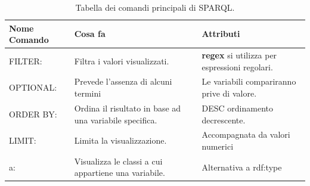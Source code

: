 \documentclass[a4paper,11pt]{article}
\begin{document}
\begin{table}[htb]
\begin{center}				
\begin{tabular}{|>{\small}l|>{\small}l|>{\small}l|}
	\hline \textbf{Nome Comando} & \textbf{Cosa fa} & \textbf{Attributi}\\				\hline FILTER: & Filtra i valori visualizzati. & \textbf{regex} si utilizza per espressioni regolari.\\
	\hline OPTIONAL: & Prevede l'assenza di alcuni termini & Le variabili compariranno prive di valore.\\
	\hline ORDER BY: & Ordina il risultato in base ad una variabile specifica. & DESC ordinamento decrescente. \\
	\hline LIMIT: & Limita la visualizzazione. & Accompagnata da valori numerici \\
	\hline a:	& Visualizza le classi a cui appartiene una variabile. & Alternativa a rdf:type\\
	\hline			
\end{tabular}	
\caption{Tabella dei comandi principali di SPARQL.}	
\end{center}	
\end{table}
\newpage
\end{document}
